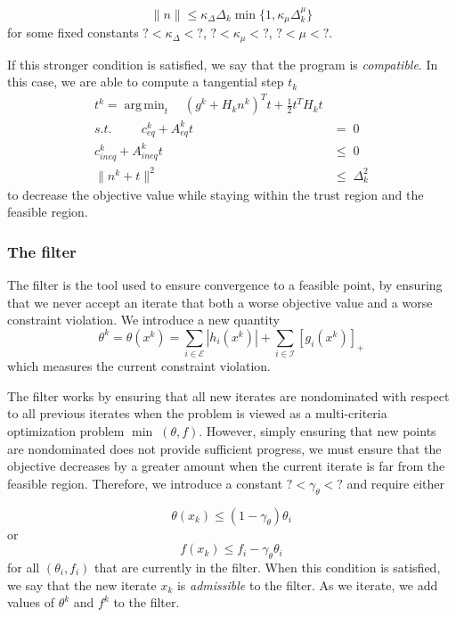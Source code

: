 \documentclass{article}
\DeclareMathOperator*{\argmin}{arg\,min}
\begin{document}
\[
\|n\|\le \kappa_{\Delta} \Delta_k \min \{1, \kappa_{\mu}\Delta_k^{\mu}\}
\]
for some fixed constants $?<\kappa_{\Delta}<?$, $?<\kappa_{\mu}<?$, $?<\mu<?$.

If this stronger condition is satisfied, we say that the program is \emph{compatible}.
In this case, we are able to compute a tangential step $t_k$
\begin{align*}
t^k =\argmin_t    \quad   (g^k+H_kn^k)^T t + \frac 1 2 t^T H_k t \\
s.t. \hspace{1cm} c_{eq}^k + A_{eq}^kt	&= \; 0 \\
     c_{ineq}^k + A_{ineq}^kt	& \le \; 0  \\
     \| n^k + t \|^2 		& \le \; \Delta_k ^2
\end{align*}
to decrease the objective value while staying within the trust region and the feasible region.



\subsubsection{The filter}

The filter is the tool used to ensure convergence to a feasible point, by ensuring that we never accept an iterate that both a worse objective value and a worse constraint violation.
We introduce a new quantity
\[
\theta^k = \theta(x^k) = \sum_{i \in \mathcal E} | h_i(x^k) | + \sum_{i \in \mathcal I} [g_i(x^k)]_+
\]
which measures the current constraint violation.

The filter works by ensuring that all new iterates are nondominated with respect to all previous iterates when the problem is viewed as a multi-criteria optimization problem $\min \; (\theta, f)$. However, simply ensuring that new points are nondominated does not provide sufficient progress, we must ensure that the objective decreases by a greater amount when the current iterate is far from the feasible region.
Therefore, we introduce a constant $?<\gamma_{\theta}<?$ and require either

\[
\theta(x_k) \le (1-\gamma_{\theta})\theta_i
\]
or
\[
f(x_k) \le f_i -\gamma_{\theta}\theta_i
\]
for all $(\theta_i, f_i)$ that are currently in the filter.
When this condition is satisfied, we say that the new iterate $x_k$ is \emph{admissible} to the filter.
As we iterate, we add values of $\theta^k$ and $f^k$ to the filter.
\end{document}
